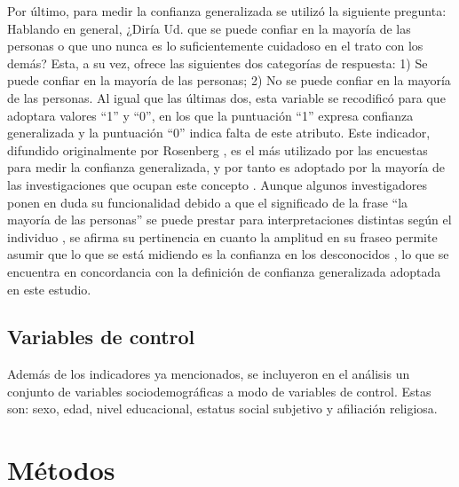 \documentclass[12pt,twoside]{templates/facsothesis}
\begin{document}
Por último, para medir la confianza generalizada se utilizó la siguiente pregunta: Hablando en general, ¿Diría Ud. que se puede confiar en la mayoría de las personas o que uno nunca es lo suficientemente cuidadoso en el trato con los demás? Esta, a su vez, ofrece las siguientes dos categorías de respuesta: 1) Se puede confiar en la mayoría de las personas; 2) No se puede confiar en la mayoría de las personas. Al igual que las últimas dos, esta variable se recodificó para que adoptara valores ``1'' y ``0'', en los que la puntuación ``1'' expresa confianza generalizada y la puntuación ``0'' indica falta de este atributo. Este indicador, difundido originalmente por Rosenberg \citeyearpar{rosenbergMisanthropyPoliticalIdeology1956}, es el más utilizado por las encuestas para medir la confianza generalizada, y por tanto es adoptado por la mayoría de las investigaciones que ocupan este concepto \citep{andrianiInstitutionalTrustCorruption2021, garcia-sanchezEconomicInequalityUnfairness2025a, mattesSocialPoliticalTrust2018, newtonThreeFormsTrust2011, oskarssonGeneralizedTrustPolitical2010}. Aunque algunos investigadores ponen en duda su funcionalidad debido a que el significado de la frase ``la mayoría de las personas'' se puede prestar para interpretaciones distintas según el individuo \citep{justwanMeasuringSocialTrust2018}, se afirma su pertinencia en cuanto la amplitud en su fraseo permite asumir que lo que se está midiendo es la confianza en los desconocidos \citep{oskarssonGeneralizedTrustPolitical2010, uslanerMoralFoundationsTrust2002}, lo que se encuentra en concordancia con la definición de confianza generalizada adoptada en este estudio.

\subsection{Variables de control}\label{variables-de-control}

Además de los indicadores ya mencionados, se incluyeron en el análisis un conjunto de variables sociodemográficas a modo de variables de control. Estas son: sexo, edad, nivel educacional, estatus social subjetivo y afiliación religiosa.

\section{Métodos}\label{muxe9todos}
\end{document}

